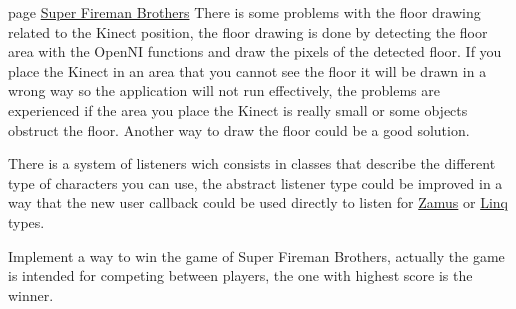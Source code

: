 \label{todo__todo000001}
\hypertarget{todo__todo000001}{}
 
\begin{DoxyDescription}
\item[page \hyperlink{index}{Super Fireman Brothers} ]There is some problems with the floor drawing related to the Kinect position, the floor drawing is done by detecting the floor area with the OpenNI functions and draw the pixels of the detected floor. If you place the Kinect in an area that you cannot see the floor it will be drawn in a wrong way so the application will not run effectively, the problems are experienced if the area you place the Kinect is really small or some objects obstruct the floor. Another way to draw the floor could be a good solution. 

There is a system of listeners wich consists in classes that describe the different type of characters you can use, the abstract listener type could be improved in a way that the new user callback could be used directly to listen for \hyperlink{classZamus}{Zamus} or \hyperlink{classLinq}{Linq} types. 

Implement a way to win the game of Super Fireman Brothers, actually the game is intended for competing between players, the one with highest score is the winner. 
\end{DoxyDescription}